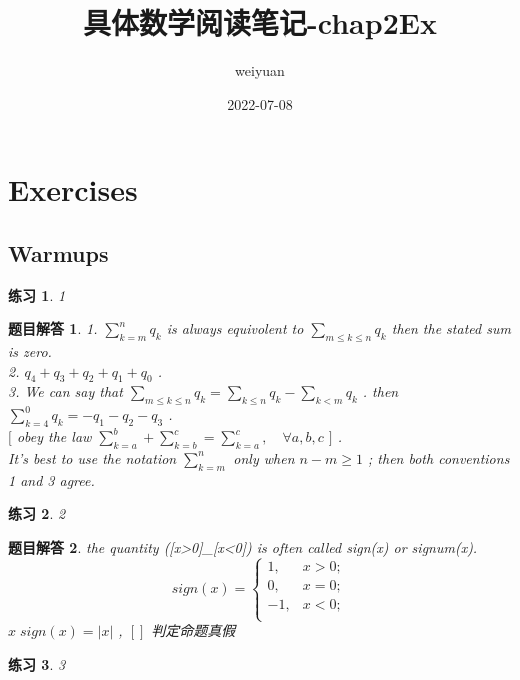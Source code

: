 \documentclass[mode=geye, chinesefont=founder]{elegantnote}
\title{具体数学阅读笔记-chap2Ex}
\author{weiyuan}
\date{2022-07-08}
\newtheorem{exercise}{练习}
\newtheorem{answer}{题目解答}
\begin{document}
\maketitle
\section{Exercises}
\subsection{Warmups}
\begin{exercise}
1
\end{exercise}

\begin{answer}
    1. $ \sum_{k=m}^{n} q_k $ is always equivolent to $ \sum_{m \leqslant k \leqslant n} q_k $ then the stated sum is zero.\\
    2. $ q_4+q_3+q_2+q_1+q_0 $ .\\
    3. We can say that $ \sum_{m \leqslant k \leqslant n} q_k = \sum_{k \leqslant n} q_k  -\sum_{k<m} q_k $ . then $ \sum_{k=4}^{0}q_k = -q_1-q_2-q_3 $ .\\
    $ [ $ obey the law 
        $ \sum_{k=a}^{b}+
        \sum_{k=b}^{c}=
        \sum_{k=a}^{c}, 
        \quad \forall a, b, c $  $ ] $ .\\
    It's best to use the notation $ \sum_{k=m}^{n} $ only when $ n-m \geqslant 1 $ ; then both conventions 1 and 3 agree.
\end{answer}

\begin{exercise}
    2
\end{exercise}

\begin{answer}
    the quantity ([x>0]\_[x<0]) is often called sign(x) or signum(x).
    \begin{equation*}
        sign(x) = \left\{
            \begin{array}{ll}
                1,  & x>0; \\
                0,  & x=0; \\
                -1, & x<0; \\
            \end{array}
        \right.
    \end{equation*}
    $ x\; sign(x) = |x| $ , $ [] $ 判定命题真假
\end{answer}

\begin{exercise}
    3
\end{exercise}
\end{document}
